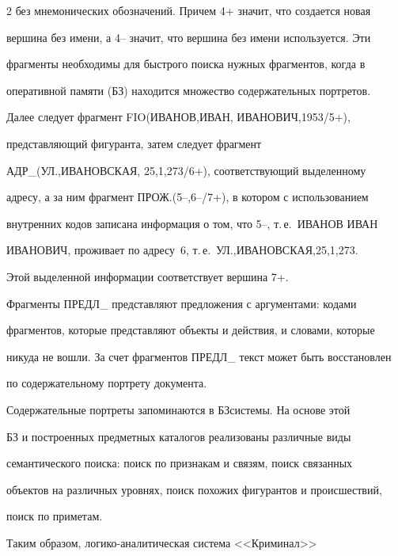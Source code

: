 \begin{multicols}{2}
без мнемонических обозначений. Причем 4+ значит, что создается новая


вершина без имени, а 4-- значит, что вершина без имени используется. Эти


фрагменты необходимы для быстрого поиска нужных фрагментов, когда в


оперативной памяти (БЗ) находится множество содержательных портретов.





 Далее следует фрагмент FIO(ИВАНОВ,ИВАН, ИВАНОВИЧ,1953/5+),


представляющий фигуранта, затем следует фрагмент


АДР\_(УЛ.,\linebreak ИВАНОВСКАЯ, 25,1,273/6+), соответствующий выделенному


адресу, а за ним фрагмент ПРОЖ.\linebreak(5--,6--/7+), в котором с использованием


внутренних кодов записана информация о том, что 5--, т.\,е.\ ИВАНОВ ИВАН


ИВАНОВИЧ, проживает по адресу~6, т.\,е.\ УЛ.,ИВАНОВСКАЯ,25,1,273.


Этой выделенной информации соответствует вершина 7+.





 Фрагменты ПРЕДЛ\_ представляют предложения с аргументами: кодами


фрагментов, которые представляют объекты и действия, и словами, которые


никуда не вошли. За счет фрагментов ПРЕДЛ\_ текст может быть восстановлен


по содержательному портрету документа.





 Содержательные портреты запоминаются в БЗ\linebreak системы. На основе этой


БЗ и построенных предметных каталогов реализованы различные виды


семанти\-ческого поиска: поиск по признакам и связям, поиск связанных


объектов на различных уровнях, поиск похожих фигурантов и происшествий,


поиск по приметам.





 Таким образом, ло\-ги\-ко-ана\-ли\-ти\-че\-ская система <<Криминал>>



\end{multicols}
